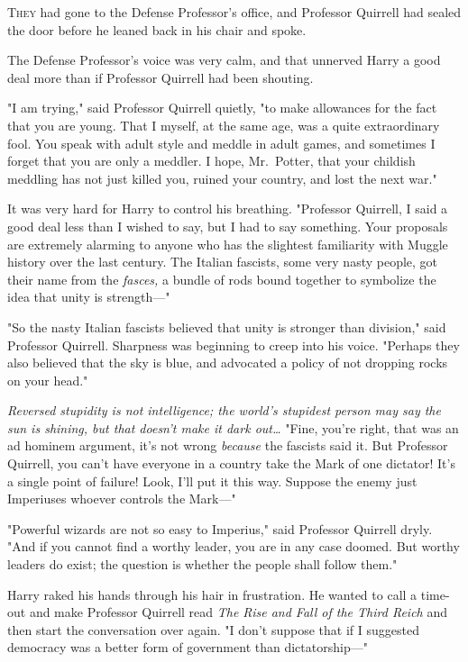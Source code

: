 
\lettrine{T}{hey} had gone to 
the Defense Professor's office, and Professor Quirrell had sealed the door 
before he leaned back in his chair and spoke.

The Defense Professor's voice was very calm, and that unnerved Harry a good 
deal more than if Professor Quirrell had been shouting.

"I am trying," said Professor Quirrell quietly, "to make allowances for the 
fact that you are young. That I myself, at the same age, was a quite 
extraordinary fool. You speak with adult style and meddle in adult games, and 
sometimes I forget that you are only a meddler. I hope, Mr.~Potter, that your 
childish meddling has not just killed you, ruined your country, and lost the 
next war."

It was very hard for Harry to control his breathing. "Professor Quirrell, I 
said a good deal less than I wished to say, but I had to say something. Your 
proposals are extremely alarming to anyone who has the slightest familiarity 
with Muggle history over the last century. The Italian fascists, some very 
nasty people, got their name from the \emph{fasces,} a bundle of rods bound 
together to symbolize the idea that unity is strength---"

"So the nasty Italian fascists believed that unity is stronger than division," 
said Professor Quirrell. Sharpness was beginning to creep into his voice. 
"Perhaps they also believed that the sky is blue, and advocated a policy of not 
dropping rocks on your head."

\emph{Reversed stupidity is not intelligence; the world's stupidest person may 
say the sun is shining, but that doesn't make it dark out{\ldots}} "Fine, 
you're right, that was an ad hominem argument, it's not wrong \emph{because} 
the fascists said it. But Professor Quirrell, you can't have everyone in a 
country take the Mark of one dictator! It's a single point of failure! Look, 
I'll put it this way. Suppose the enemy just Imperiuses whoever controls the 
Mark---"

"Powerful wizards are not so easy to Imperius," said Professor Quirrell dryly. 
"And if you cannot find a worthy leader, you are in any case doomed. But worthy 
leaders do exist; the question is whether the people shall follow them."

Harry raked his hands through his hair in frustration. He wanted to call a 
time-out and make Professor Quirrell read \emph{The Rise and Fall of the Third 
Reich} and then start the conversation over again. "I don't suppose that if I 
suggested democracy was a better form of government than dictatorship---"


